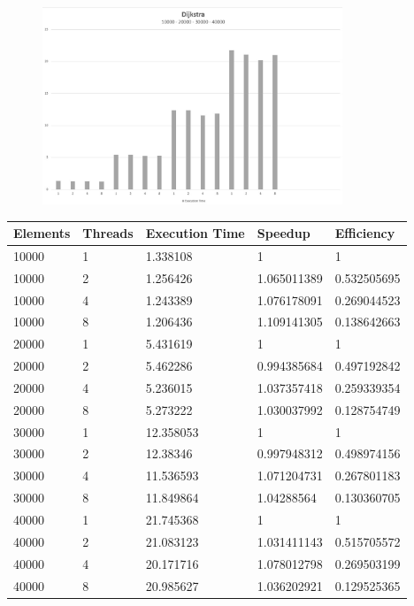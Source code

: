 \begin{figure}[H]
    \centering
    \includegraphics[width=0.8\textwidth]{graphics/Dijkstra.jpg}
    \label{fig:Dijkstra}
\end{figure}
\begin{table}[H]
    \centering
    \begin{tabular}{|l|l|l|l|l|}\hline
        Elements & Threads & Execution Time & Speedup & Efficiency \\\hline
        10000 & 1 & 1.338108 & 1 & 1 \\
        10000 & 2 & 1.256426 & 1.065011389 & 0.532505695\\
        10000 & 4 & 1.243389 & 1.076178091 & 0.269044523\\
        10000 & 8 & 1.206436 & 1.109141305 & 0.138642663\\\hline
        20000 & 1 & 5.431619 & 1 & 1\\
        20000 & 2 & 5.462286 & 0.994385684 & 0.497192842\\
        20000 & 4 & 5.236015 & 1.037357418 & 0.259339354\\
        20000 & 8 & 5.273222 & 1.030037992 & 0.128754749\\\hline
        30000 & 1 & 12.358053 & 1 & 1\\
        30000 & 2 & 12.38346 & 0.997948312 & 0.498974156\\
        30000 & 4 & 11.536593 & 1.071204731 & 0.267801183\\
        30000 & 8 & 11.849864 & 1.04288564 & 0.130360705\\\hline
        40000 & 1 & 21.745368 & 1 & 1\\
        40000 & 2 & 21.083123 & 1.031411143 & 0.515705572\\
        40000 & 4 & 20.171716 & 1.078012798 & 0.269503199\\
        40000 & 8 & 20.985627 & 1.036202921 & 0.129525365\\\hline
        

    \end{tabular}
    \label{tab:Dijkstra_Table}
\end{table}

